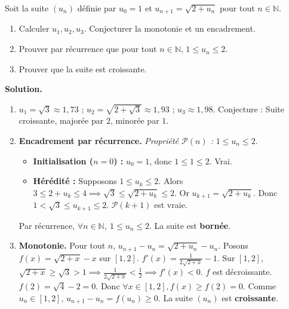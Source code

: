 \documentclass[11pt]{article}
\begin{document}
\begin{exoresolu}
Soit la suite $(u_n)$ définie par $u_0 = 1$ et $u_{n+1} = \sqrt{2 + u_n}$ pour tout $n \in \mathbb{N}$.
\begin{enumerate}
    \item Calculer $u_1, u_2, u_3$. Conjecturer la monotonie et un encadrement.
    \item Prouver par récurrence que pour tout $n \in \mathbb{N}$, $1 \le u_n \le 2$.
    \item Prouver que la suite est croissante.
\end{enumerate}
\tcblower
\textbf{Solution.}
\begin{enumerate}
    \item $u_1 = \sqrt{3} \approx 1{,}73$ ; $u_2 = \sqrt{2+\sqrt{3}} \approx 1{,}93$ ; $u_3 \approx 1{,}98$.
    Conjecture : Suite croissante, majorée par $2$, minorée par $1$.
    \item \textbf{Encadrement par récurrence.}
    \emph{Propriété $\mathcal{P}(n)$ :} $1 \le u_n \le 2$.
    \begin{itemize}
        \item \textbf{Initialisation ($n=0$) :} $u_0=1$, donc $1 \le 1 \le 2$. Vrai.
        \item \textbf{Hérédité :} Supposons $1 \le u_k \le 2$.
        Alors $3 \le 2+u_k \le 4 \implies \sqrt{3} \le \sqrt{2+u_k} \le 2$.
        Or $u_{k+1} = \sqrt{2+u_k}$. Donc $1 < \sqrt{3} \le u_{k+1} \le 2$.
        $\mathcal{P}(k+1)$ est vraie.
    \end{itemize}
    Par récurrence, $\forall n \in \mathbb{N},\ 1 \le u_n \le 2$. La suite est \textbf{bornée}.
    \item \textbf{Monotonie.}
    Pour tout $n$, $u_{n+1} - u_n = \sqrt{2+u_n} - u_n$.
    Posons $f(x) = \sqrt{2+x} - x$ sur $[1, 2]$.
    $f'(x) = \frac{1}{2\sqrt{2+x}} - 1$. Sur $[1,2]$, $\sqrt{2+x} \ge \sqrt{3} > 1 \implies \frac{1}{2\sqrt{2+x}} < \frac{1}{2} \implies f'(x) < 0$.
    $f$ est décroissante. $f(2) = \sqrt{4}-2 = 0$. Donc $\forall x \in [1,2], f(x) \ge f(2) = 0$.
    Comme $u_n \in [1,2]$, $u_{n+1}-u_n = f(u_n) \ge 0$.
    La suite $(u_n)$ est \textbf{croissante}.
\end{enumerate}
\end{exoresolu}
\end{document}
